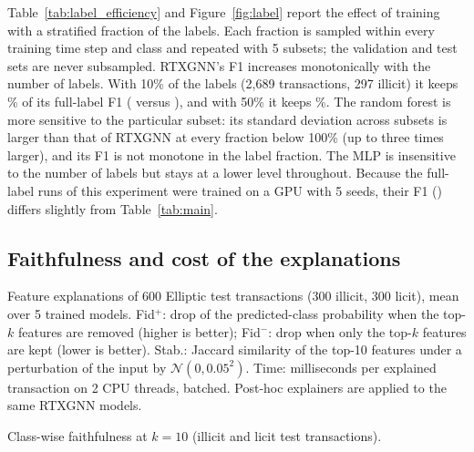 Table~\ref{tab:label_efficiency} and Figure~\ref{fig:label} report the effect of training with a stratified fraction of the labels. Each fraction is sampled within every training time step and class and repeated with 5 subsets; the validation and test sets are never subsampled. RTXGNN's F1 increases monotonically with the number of labels. With 10\% of the labels (2,689 transactions, 297 illicit) it keeps \lertxgnnOneZeroPct\% of its full-label F1 (\lertxgnnOneZero{} versus \lertxgnnOneZeroZero{}), and with 50\% it keeps \lertxgnnFiveZeroPct\%. The random forest is more sensitive to the particular subset: its standard deviation across subsets is larger than that of RTXGNN at every fraction below 100\% (up to three times larger), and its F1 is not monotone in the label fraction. The MLP is insensitive to the number of labels but stays at a lower level throughout. Because the full-label runs of this experiment were trained on a GPU with 5 seeds, their F1 (\lertxgnnOneZeroZero) differs slightly from Table~\ref{tab:main}.

\subsection{Faithfulness and cost of the explanations}
\label{subsec:explanations}

\begin{table}[!t]
\centering
\caption{Feature explanations of 600 Elliptic test transactions (300 illicit, 300 licit), mean over 5 trained models. Fid$^{+}$: drop of the predicted-class probability when the top-$k$ features are removed (higher is better); Fid$^{-}$: drop when only the top-$k$ features are kept (lower is better). Stab.: Jaccard similarity of the top-10 features under a perturbation of the input by $\mathcal{N}(0,0.05^2)$. Time: milliseconds per explained transaction on 2 CPU threads, batched. Post-hoc explainers are applied to the same RTXGNN models.}
\label{tab:explanations}
\footnotesize
\setlength{\tabcolsep}{3pt}
\begin{adjustbox}{max width=\textwidth}\end{adjustbox}
\end{table}

\begin{table}[!t]
\centering
\caption{Class-wise faithfulness at $k=10$ (illicit and licit test transactions).}
\label{tab:explanations_class}
\footnotesize
\begin{adjustbox}{max width=\textwidth}\end{adjustbox}
\end{table}

